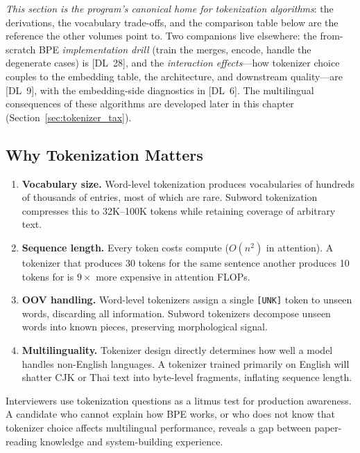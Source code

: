 \emph{This section is the program's canonical home for tokenization algorithms}: the
derivations, the vocabulary trade-offs, and the comparison table below are the reference the
other volumes point to.  Two companions live elsewhere: the from-scratch BPE
\emph{implementation drill} (train the merges, encode, handle the degenerate cases) is
[DL~28], and the \emph{interaction effects}---how tokenizer choice couples to the
embedding table, the architecture, and downstream quality---are [DL~9], with the
embedding-side diagnostics in [DL~6].  The multilingual consequences of these algorithms
are developed later in this chapter (Section~\ref{sec:tokenizer_tax}).

\subsection{Why Tokenization Matters}

\begin{enumerate}[label=\textbf{\arabic*.}]
    \item \textbf{Vocabulary size.}  Word-level tokenization produces vocabularies of
          hundreds of thousands of entries, most of which are rare.  Subword tokenization
          compresses this to 32K--100K tokens while retaining coverage of arbitrary text.
    \item \textbf{Sequence length.}  Every token costs compute ($O(n^2)$ in attention).
          A tokenizer that produces 30 tokens for the same sentence another produces 10
          tokens for is $9\times$ more expensive in attention FLOPs.
    \item \textbf{OOV handling.}  Word-level tokenizers assign a single \texttt{[UNK]}
          token to unseen words, discarding all information.  Subword tokenizers decompose
          unseen words into known pieces, preserving morphological signal.
    \item \textbf{Multilinguality.}  Tokenizer design directly determines how well a model
          handles non-English languages.  A tokenizer trained primarily on English will
          shatter CJK or Thai text into byte-level fragments, inflating sequence length.
\end{enumerate}

\begin{warningbox}
Interviewers use tokenization questions as a litmus test for production awareness.  A
candidate who cannot explain how BPE works, or who does not know that tokenizer choice
affects multilingual performance, reveals a gap between paper-reading knowledge and
system-building experience.
\end{warningbox}

